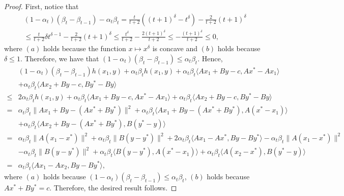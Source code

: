 \documentclass{article}
\numberwithin{equation}{section}
\begin{document}
\begin{proof}
    First, notice that
    \begin{align}
        &(1-\alpha_t)(\beta_{t}-\beta_{t-1}) -\alpha_t \beta_{t} = \frac{t}{t+2}\left((t+1)^{\delta}
        -t^{\delta}\right) -\frac{2}{t+2}(t+1)^{\delta} \nonumber \\
        & \overset{\mathop{(a)}}{\leq} \frac{t}{t+2}\delta t^{\delta -1} -\frac{2}{t+2}(t+1)^{\delta} 
        \overset{\mathop{(b)}}{\leq} \frac{t^{\delta}}{t+2} -\frac{2(t+1)^{\delta}}{t+2} \leq -\frac{(t+1)^{\delta}}{t+2} \leq 0, 
        \nonumber
    \end{align}
    where $(a)$ holds because the function $x \mapsto x^{\delta}$ is concave and $(b)$ holds
    because $\delta \leq 1$.
    Therefore, we have that $(1-\alpha_t)(\beta_{t}-\beta_{t-1})\leq \alpha_t \beta_{t}$. 
    Hence, 
    \begin{align}
        &(1-\alpha_t)(\beta_{t}-\beta_{t-1})h(x_1,y) + \alpha_t\beta_{t}h(x_1,y) + \alpha_t\beta_{t}\langle Ax_1+By-c,Ax^*-Ax_1\rangle \nonumber \\
        &+ \alpha_t\beta_{t}\langle Ax_2 +By -c, By^* -By\rangle  \nonumber \\
        \overset{\mathop{(a)}}{\leq}& 2\alpha_t\beta_{t} h(x_1,y) + \alpha_t\beta_{t}\langle Ax_1+By-c,Ax^*-Ax_1\rangle+ \alpha_t\beta_{t}\langle Ax_2 +By -c, By^* -By\rangle \nonumber \\
        \overset{\mathop{(b)}}{=}& \alpha_t\beta_t\|Ax_1+By-(Ax^*+ By^*)\rVert^2 +\alpha_t\beta_{t} \langle Ax_1 +By-(Ax^*+By^*),A(x^*-x_1) \rangle \nonumber\\
        &+ \alpha_t\beta_{t}\langle Ax_2 +By-(Ax^*+By^*), B(y^*-y) \rangle \nonumber \\
        =& {\alpha_t\beta_{t}}\|A(x_1-x^*)\rVert^2 + {\alpha_t\beta_{t}}\|B(y-y^*)\rVert^2 +2\alpha_t\beta_{t}\langle Ax_1-Ax^*, By-By^*\rangle -\alpha_t\beta_{t}\|A(x_1-x^*)\rVert^2       \nonumber \\
        & -\alpha_t\beta_{t}\|B(y-y^*)\rVert^2 +\alpha_t\beta_{t}\langle B(y-y^*), A(x^*-x_1) \rangle +\alpha_t\beta_{t}\langle A(x_2-x^*), B(y^*-y) \rangle  \nonumber \\
        =&\alpha_t\beta_t \langle Ax_1 -Ax_2, By-By^* \rangle, \nonumber
    \end{align} 
    where $(a)$ holds because $(1-\alpha_t)(\beta_{t}-\beta_{t-1})\leq \alpha_t \beta_{t}$, $(b)$ holds because $Ax^*+ By^* =c$. 
    Therefore, the desired result follows. 
\end{proof}
\end{document}
